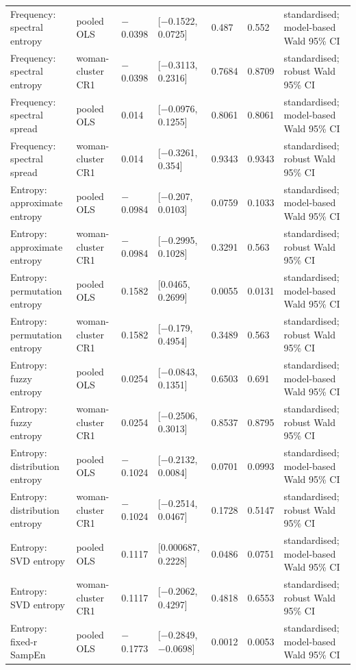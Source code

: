 \documentclass[10pt]{article}
\begin{document}
\begin{landscape}
\begin{longtable}{p{4.0cm}p{3.4cm}p{2.0cm}p{3.4cm}p{1.9cm}p{1.9cm}p{5.2cm}}
Frequency: spectral entropy & pooled OLS & $-$0.0398 & [$-$0.1522, 0.0725] & 0.487 & 0.552 & standardised; model-based Wald 95\% CI \\
Frequency: spectral entropy & woman-cluster CR1 & $-$0.0398 & [$-$0.3113, 0.2316] & 0.7684 & 0.8709 & standardised; robust Wald 95\% CI \\
Frequency: spectral spread & pooled OLS & 0.014 & [$-$0.0976, 0.1255] & 0.8061 & 0.8061 & standardised; model-based Wald 95\% CI \\
Frequency: spectral spread & woman-cluster CR1 & 0.014 & [$-$0.3261, 0.354] & 0.9343 & 0.9343 & standardised; robust Wald 95\% CI \\
Entropy: approximate entropy & pooled OLS & $-$0.0984 & [$-$0.207, 0.0103] & 0.0759 & 0.1033 & standardised; model-based Wald 95\% CI \\
Entropy: approximate entropy & woman-cluster CR1 & $-$0.0984 & [$-$0.2995, 0.1028] & 0.3291 & 0.563 & standardised; robust Wald 95\% CI \\
Entropy: permutation entropy & pooled OLS & 0.1582 & [0.0465, 0.2699] & 0.0055 & 0.0131 & standardised; model-based Wald 95\% CI \\
Entropy: permutation entropy & woman-cluster CR1 & 0.1582 & [$-$0.179, 0.4954] & 0.3489 & 0.563 & standardised; robust Wald 95\% CI \\
Entropy: fuzzy entropy & pooled OLS & 0.0254 & [$-$0.0843, 0.1351] & 0.6503 & 0.691 & standardised; model-based Wald 95\% CI \\
Entropy: fuzzy entropy & woman-cluster CR1 & 0.0254 & [$-$0.2506, 0.3013] & 0.8537 & 0.8795 & standardised; robust Wald 95\% CI \\
Entropy: distribution entropy & pooled OLS & $-$0.1024 & [$-$0.2132, 0.0084] & 0.0701 & 0.0993 & standardised; model-based Wald 95\% CI \\
Entropy: distribution entropy & woman-cluster CR1 & $-$0.1024 & [$-$0.2514, 0.0467] & 0.1728 & 0.5147 & standardised; robust Wald 95\% CI \\
Entropy: SVD entropy & pooled OLS & 0.1117 & [0.000687, 0.2228] & 0.0486 & 0.0751 & standardised; model-based Wald 95\% CI \\
Entropy: SVD entropy & woman-cluster CR1 & 0.1117 & [$-$0.2062, 0.4297] & 0.4818 & 0.6553 & standardised; robust Wald 95\% CI \\
Entropy: fixed-r SampEn & pooled OLS & $-$0.1773 & [$-$0.2849, $-$0.0698] & 0.0012 & 0.0053 & standardised; model-based Wald 95\% CI \\

\end{longtable}
\end{landscape}
\end{document}
